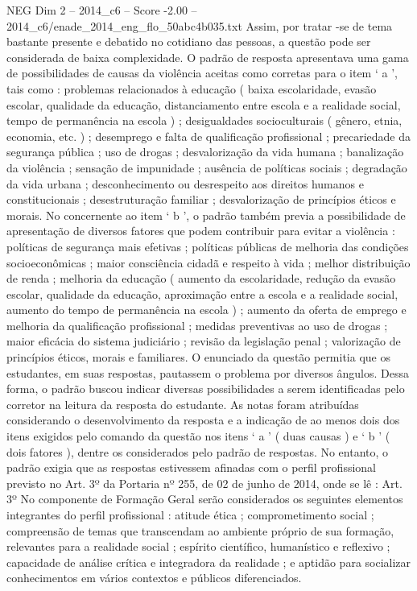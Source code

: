 \begin{textsample}{NEG Dim 2 – 2014\_c6 – Score -2.00 – 2014\_c6/enade\_2014\_eng\_flo\_50abc4b035.txt}
Assim, por tratar -se de tema bastante presente e debatido no cotidiano das pessoas, a questão pode ser considerada de baixa complexidade.
O padrão de resposta apresentava uma gama de possibilidades de causas da violência aceitas como corretas para o item ‘ a ’, tais como : problemas relacionados à educação ( baixa escolaridade, evasão escolar, qualidade da educação, distanciamento entre escola e a realidade social, tempo de permanência na escola ) ; desigualdades socioculturais ( gênero, etnia, economia, etc. ) ; desemprego e falta de qualificação profissional ; precariedade da segurança pública ; uso de drogas ; desvalorização da vida humana ; banalização da violência ; sensação de impunidade ; ausência de políticas sociais ; degradação da vida urbana ; desconhecimento ou desrespeito aos direitos humanos e constitucionais ; desestruturação familiar ; desvalorização de princípios éticos e morais.
No concernente ao item ‘ b ’, o padrão também previa a possibilidade de apresentação de diversos fatores que podem contribuir para evitar a violência : políticas de segurança mais efetivas ; políticas públicas de melhoria das condições socioeconômicas ; maior consciência cidadã e respeito à vida ; melhor distribuição de renda ; melhoria da educação ( aumento da escolaridade, redução da evasão escolar, qualidade da educação, aproximação entre a escola e a realidade social, aumento do tempo de permanência na escola ) ; aumento da oferta de emprego e melhoria da qualificação profissional ; medidas preventivas ao uso de drogas ; maior eficácia do sistema judiciário ; revisão da legislação penal ; valorização de princípios éticos, morais e familiares.
O enunciado da questão permitia que os estudantes, em suas respostas, pautassem o problema por diversos ângulos.
Dessa forma, o padrão buscou indicar diversas possibilidades a serem identificadas pelo corretor na leitura da resposta do estudante.
As notas foram atribuídas considerando o desenvolvimento da resposta e a indicação de ao menos dois dos itens exigidos pelo comando da questão nos itens ‘ a ’ ( duas causas ) e ‘ b ’ ( dois fatores ), dentre os considerados pelo padrão de respostas.
No entanto, o padrão exigia que as respostas estivessem afinadas com o perfil profissional previsto no Art. 3º da Portaria nº 255, de 02 de junho de 2014, onde se lê : Art. 3º No componente de Formação Geral serão considerados os seguintes elementos integrantes do perfil profissional : atitude ética ; comprometimento social ; compreensão de temas que transcendam ao ambiente próprio de sua formação, relevantes para a realidade social ; espírito científico, humanístico e reflexivo ; capacidade de análise crítica e integradora da realidade ; e aptidão para socializar conhecimentos em vários contextos e públicos diferenciados.

\end{textsample}
